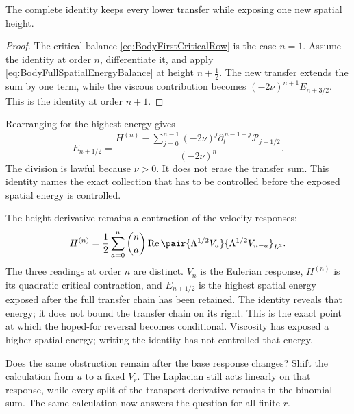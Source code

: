 The complete identity keeps every lower transfer while exposing one new
spatial height.
\begin{proof}
The critical balance \eqref{eq:BodyFirstCriticalRow} is the case \(n=1\).
Assume the identity at order \(n\), differentiate it, and apply
\eqref{eq:BodyFullSpatialEnergyBalance} at height \(n+\tfrac12\).  The new
transfer extends the sum by one term, while the viscous contribution becomes
  \((-2\nu)^{n+1}E_{n+3/2}\).  This is the identity at order \(n+1\).
\end{proof}
Rearranging for the highest energy gives
\begin{equation}\label{eq:BodyCompletedCriticalRow}
  E_{n+1/2}
  =\frac{
    H^{(n)}-
    \displaystyle\sum_{j=0}^{n-1}
    (-2\nu)^j\partial_t^{\,n-1-j}\mathcal P_{j+1/2}
  }{(-2\nu)^n}.
\end{equation}
The division is lawful because \(\nu>0\).  It does not erase the transfer
sum.  This identity names the exact collection that has to be controlled
before the exposed spatial energy is controlled.

The height derivative remains a contraction of the velocity responses:
\begin{equation}\label{eq:BodyHeightDerivativeVelocityContraction}
  H^{(n)}
  =\frac12\sum_{a=0}^{n}\binom{n}{a}
  \operatorname{Re}
  \pair{\Lambda^{1/2}V_a}
       {\Lambda^{1/2}V_{n-a}}_{L^2}.
\end{equation}
The three readings at order \(n\) are distinct.  \(V_n\) is the Eulerian
response, \(H^{(n)}\) is its quadratic critical contraction, and
\(E_{n+1/2}\) is the highest spatial energy exposed after the full transfer
chain has been retained.  The identity reveals that energy; it does not bound
the transfer chain on its right.  This is the exact point at which the hoped-for
reversal becomes conditional.  Viscosity has exposed a higher spatial energy;
writing the identity has not controlled that energy.

Does the same obstruction remain after the base response changes?  Shift the
calculation from \(u\) to a fixed \(V_r\).  The Laplacian still acts linearly on
that response, while every split of the transport derivative remains in the
binomial sum.  The same calculation now answers the question for all finite
\(r\).
